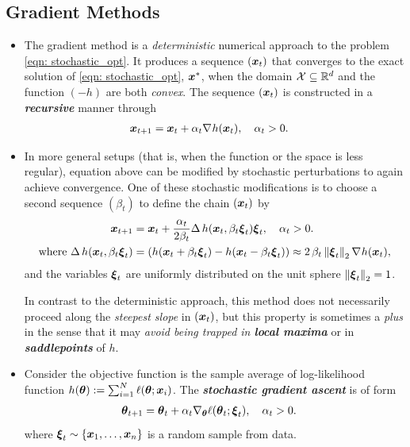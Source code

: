 \documentclass[11pt]{article}
\begin{document}
\subsection{Gradient Methods}
\begin{itemize}
\item The gradient method is a \emph{deterministic} numerical approach to the problem \eqref{eqn: stochastic_opt}. It produces a sequence $(\boldsymbol{x}_{t})$ that converges to the exact solution of \eqref{eqn: stochastic_opt}, $\boldsymbol{x}^{*}$, when the domain ${\mathcal X} \subseteq {\mathbb R}^d$ and the function $(-h)$ are both \emph{convex}. The sequence $(\boldsymbol{x}_{t})$ is constructed in a \emph{\textbf{recursive}} manner through
\begin{align*}
\boldsymbol{x}_{t+1} &= \boldsymbol{x}_{t} + \alpha_{t}\nabla_{}{h(\boldsymbol{x}_t)}, \quad \alpha_t > 0.
\end{align*}

\item In more general setups (that is, when the function or the space is less regular), equation above can be modified by stochastic perturbations to again achieve convergence. One of these stochastic modifications is to choose a second sequence $(\beta_t)$ to define the chain  $(\boldsymbol{x}_{t})$ by
\begin{align}
\boldsymbol{x}_{t+1} &= \boldsymbol{x}_{t} + \frac{\alpha_{t}}{2\beta_{t}}\Delta\,h(\boldsymbol{x}_t, \beta_{t}\boldsymbol{\xi}_{t})\boldsymbol{\xi}_{t}, \quad \alpha_t > 0. \label{eqn: sgd}\\
\text{where }\Delta\,h(\boldsymbol{x}_t, \beta_{t}\boldsymbol{\xi}_{t}) &= \left(h(\boldsymbol{x}_t + \beta_{t}\boldsymbol{\xi}_{t}) - h(\boldsymbol{x}_t - \beta_{t}\boldsymbol{\xi}_{t})\right) \approx 2\,\beta_{t}\left\|\boldsymbol{\xi}_{t}\right\|_{2}\nabla_{}{h(\boldsymbol{x}_t)}, \nonumber
\end{align} and the variables $\boldsymbol{\xi}_{t}$ are uniformly distributed on the unit sphere $\left\|\boldsymbol{\xi}_{t}\right\|_{2} = 1$.

In contrast to the deterministic approach, this method does not necessarily proceed along the \emph{steepest slope} in $(\boldsymbol{x}_{t})$, but this property is sometimes a \emph{plus} in the sense that it may \emph{avoid being trapped in \textbf{local maxima}} or in \emph{\textbf{saddlepoints}} of $h$.

\item Consider the objective function is the sample average of log-likelihood function 
$h(\boldsymbol{\theta}): = \sum_{i=1}^{N}\ell(\boldsymbol{\theta}; \boldsymbol{x}_i)$. The \emph{\textbf{stochastic gradient ascent}} is of form
\begin{align}
\boldsymbol{\theta}_{t+1} &= \boldsymbol{\theta}_{t} + \alpha_{t}\nabla_{\boldsymbol{\theta}}{\ell(\boldsymbol{\theta}_{t}; \boldsymbol{\xi}_t)}, \quad \alpha_t > 0.
\label{eqn: sgd_2}
\end{align} where $\boldsymbol{\xi}_{t} \sim \left\{\boldsymbol{x}_1, \ldots, \boldsymbol{x}_{n}\right\}$ is a random sample from data.
\end{itemize}
\end{document}
